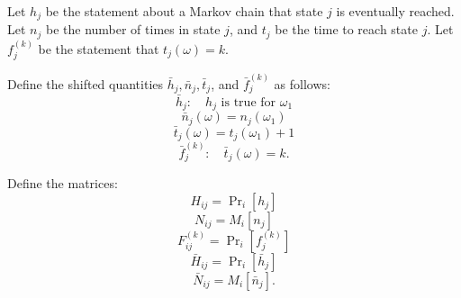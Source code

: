 Let $h_j$ be the statement about a Markov chain that state $j$ is eventually reached. Let $n_j$ be the number of times in state $j$, and $t_j$ be the time to reach state $j$. Let $f_j^{(k)}$ be the statement that $t_j(\omega) = k$.

Define the shifted quantities $\bar{h}_j, \bar{n}_j, \bar{t}_j$, and $\bar{f}_j^{(k)}$ as follows:
$$\bar{h}_j: \quad h_j \text{ is true for } \omega_1$$
$$\bar{n}_j(\omega) = n_j(\omega_1)$$
$$\bar{t}_j(\omega) = t_j(\omega_1) + 1$$
$$\bar{f}_j^{(k)}: \quad \bar{t}_j(\omega) = k.$$

Define the matrices:
$$H_{ij} = \Pr\nolimits_i[h_j]$$
$$N_{ij} = M_i[n_j]$$
$$F_{ij}^{(k)} = \Pr\nolimits_i[f_j^{(k)}]$$
$$\bar{H}_{ij} = \Pr\nolimits_i[\bar{h}_j]$$
$$\bar{N}_{ij} = M_i[\bar{n}_j].$$
